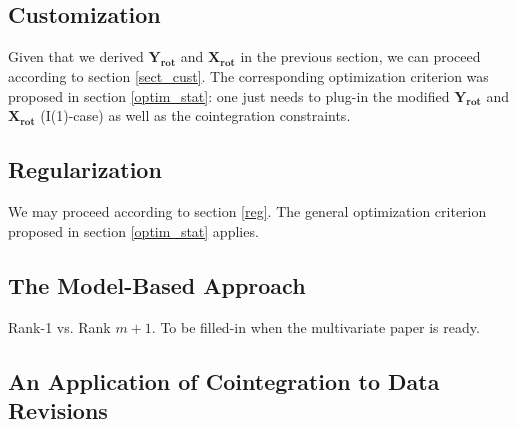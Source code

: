 \documentclass[11pt]{article}
\begin{document}
\subsection{Customization}

Given that we derived $\mathbf{Y_{rot}}$ and $\mathbf{X_{rot}}$ in the previous section, we can proceed according to section \ref{sect_cust}. The corresponding optimization criterion was proposed in section \ref{optim_stat}: one just needs to plug-in the modified $\mathbf{Y_{rot}}$ and $\mathbf{X_{rot}}$ (I(1)-case) as well as the cointegration constraints.


\subsection{Regularization}

We may proceed according to section \ref{reg}.  The general optimization criterion proposed in section \ref{optim_stat} applies.




\subsection{The Model-Based Approach}

Rank-1 vs. Rank $m+1$. To be filled-in when the multivariate paper is ready.



\subsection{An Application of Cointegration to Data Revisions}
\end{document}
